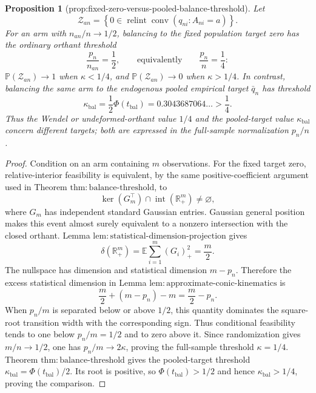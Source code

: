 \documentclass{article}
\newtheorem{proposition}{Proposition}
\begin{document}
\begin{proposition}[prop:fixed-zero-versus-pooled-balance-threshold]\label{prop:fixed-zero-versus-pooled-balance-threshold}
Let
\[
 \mathcal Z_{an}=\left\{0\in\operatorname{relint}
 \operatorname{conv}(q_{ni}:A_{ni}=a)\right\}.
\]
For an arm with \(n_{an}/n\to1/2\), balancing to the fixed population target zero has the ordinary orthant threshold
\[
 \frac{p_n}{n_{an}}=\frac12,
 \qquad\text{equivalently}\qquad \frac{p_n}{n}=\frac14:
\]
\(\mathbb P(\mathcal Z_{an})\to1\) when \(\kappa<1/4\), and \(\mathbb P(\mathcal Z_{an})\to0\) when \(\kappa>1/4\).  In contrast, balancing the same arm to the endogenous pooled empirical target \(\bar q_n\) has threshold
\[
 \kappa_{\mathrm{bal}}=\frac12\Phi(t_{\mathrm{bal}})
 =0.3043687064\ldots>\frac14.
\]
Thus the Wendel or undeformed-orthant value \(1/4\) and the pooled-target value \(\kappa_{\mathrm{bal}}\) concern different targets; both are expressed in the full-sample normalization \(p_n/n\).
\end{proposition}
\begin{proof}
Condition on an arm containing \(m\) observations.  For the fixed target zero, relative-interior feasibility is equivalent, by the same positive-coefficient argument used in Theorem \(\mathrm{thm{:}balance\mbox{-}threshold}\), to
\[
 \ker(G_m^\top)\cap\operatorname{int}(\mathbb R_+^m)\ne\varnothing,
\]
where \(G_m\) has independent standard Gaussian entries.  Gaussian general position makes this event almost surely equivalent to a nonzero intersection with the closed orthant.  Lemma \(\mathrm{lem{:}statistical\mbox{-}dimension\mbox{-}projection}\) gives
\[
 \delta(\mathbb R_+^m)
 =\mathbb E\sum_{i=1}^m(G_i)_+^2
 =\frac m2.
\]
The nullspace has dimension and statistical dimension \(m-p_n\).  Therefore the excess statistical dimension in Lemma \(\mathrm{lem{:}approximate\mbox{-}conic\mbox{-}kinematics}\) is
\[
 \frac m2+(m-p_n)-m=\frac m2-p_n.
\]
When \(p_n/m\) is separated below or above \(1/2\), this quantity dominates the square-root transition width with the corresponding sign.  Thus conditional feasibility tends to one below \(p_n/m=1/2\) and to zero above it.  Since randomization gives \(m/n\to1/2\), one has \(p_n/m\to2\kappa\), proving the full-sample threshold \(\kappa=1/4\).  Theorem \(\mathrm{thm{:}balance\mbox{-}threshold}\) gives the pooled-target threshold \(\kappa_{\mathrm{bal}}=\Phi(t_{\mathrm{bal}})/2\).  Its root is positive, so \(\Phi(t_{\mathrm{bal}})>1/2\) and hence \(\kappa_{\mathrm{bal}}>1/4\), proving the comparison.
\end{proof}
\end{document}
